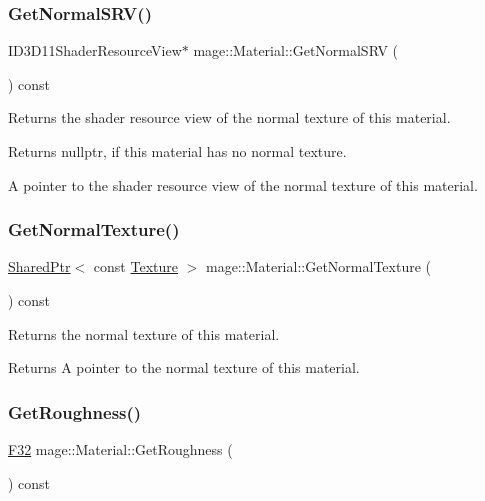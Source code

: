 \subsubsection{\texorpdfstring{Get\+Normal\+S\+R\+V()}{GetNormalSRV()}}
{\footnotesize\ttfamily I\+D3\+D11\+Shader\+Resource\+View$\ast$ mage\+::\+Material\+::\+Get\+Normal\+S\+RV (\begin{DoxyParamCaption}{ }\end{DoxyParamCaption}) const\hspace{0.3cm}{\ttfamily [noexcept]}}

Returns the shader resource view of the normal texture of this material.

\begin{DoxyReturn}{Returns}
{\ttfamily nullptr}, if this material has no normal texture. 

A pointer to the shader resource view of the normal texture of this material. 
\end{DoxyReturn}
\hypertarget{structmage_1_1_material_a41a286cf05a2627ee0baef602b01a1fb}{}\label{structmage_1_1_material_a41a286cf05a2627ee0baef602b01a1fb} 
\subsubsection{\texorpdfstring{Get\+Normal\+Texture()}{GetNormalTexture()}}
{\footnotesize\ttfamily \hyperlink{namespacemage_a1e01ae66713838a7a67d30e44c67703e}{Shared\+Ptr}$<$ const \hyperlink{classmage_1_1_texture}{Texture} $>$ mage\+::\+Material\+::\+Get\+Normal\+Texture (\begin{DoxyParamCaption}{ }\end{DoxyParamCaption}) const\hspace{0.3cm}{\ttfamily [noexcept]}}

Returns the normal texture of this material.

\begin{DoxyReturn}{Returns}
A pointer to the normal texture of this material. 
\end{DoxyReturn}
\hypertarget{structmage_1_1_material_a5b1a4e965f812e18594cf7455d49139c}{}\label{structmage_1_1_material_a5b1a4e965f812e18594cf7455d49139c} 
\subsubsection{\texorpdfstring{Get\+Roughness()}{GetRoughness()}}
{\footnotesize\ttfamily \hyperlink{namespacemage_aa97e833b45f06d60a0a9c4fc22ae02c0}{F32} mage\+::\+Material\+::\+Get\+Roughness (\begin{DoxyParamCaption}{ }\end{DoxyParamCaption}) const\hspace{0.3cm}{\ttfamily [noexcept]}}

